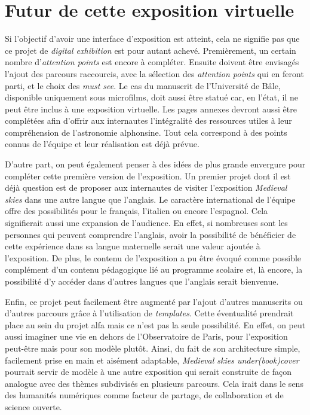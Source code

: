 	\section{Futur de cette exposition virtuelle}
	Si l'objectif d'avoir une interface d'exposition est atteint, cela ne signifie pas que ce projet de \textit{digital exhibition} est pour autant achevé. Premièrement, un certain nombre d'\textit{attention points} est encore à compléter. Ensuite doivent être envisagés l'ajout des parcours raccourcis, avec la sélection des \textit{attention points} qui en feront parti, et le choix des \textit{must see}. Le cas du manuscrit de l'Université de Bâle, disponible uniquement sous microfilms, doit aussi être statué car, en l'état, il ne peut être inclus à une exposition virtuelle. Les pages annexes devront aussi être complétées afin d'offrir aux internautes l'intégralité des ressources utiles à leur compréhension de l'astronomie alphonsine. Tout cela correspond à des points connus de l'équipe et leur réalisation est déjà prévue. 
	
	D'autre part, on peut également penser à des idées de plus grande envergure pour compléter cette première version de l'exposition. Un premier projet dont il est déjà question est de proposer aux internautes de visiter l'exposition \textit{Medieval skies} dans une autre langue que l'anglais. Le caractère international de l'équipe offre des possibilités pour le français, l'italien ou encore l'espagnol. Cela signifierait aussi une expansion de l'audience. En effet, si nombreuses sont les personnes qui peuvent comprendre l'anglais, avoir la possibilité de bénéficier de cette expérience dans sa langue maternelle serait une valeur ajoutée à l'exposition. De plus, le contenu de l'exposition a pu être évoqué comme possible complément d'un contenu pédagogique lié au programme scolaire et, là encore, la possibilité d'y accéder dans d'autres langues que l'anglais serait bienvenue. 
	
	Enfin, ce projet peut facilement être augmenté par l'ajout d'autres manuscrits ou d'autres parcours grâce à l'utilisation de \textit{templates}. Cette éventualité prendrait place au sein du projet \acrshort{alfa} mais ce n'est pas la seule possibilité. En effet, on peut aussi imaginer une vie en dehors de l'Observatoire de Paris, pour l'exposition peut-être mais pour son modèle plutôt. Ainsi, du fait de son architecture simple, facilement prise en main et aisément adaptable, \textit{Medieval skies under(book)cover} pourrait servir de modèle à une autre exposition qui serait construite de façon analogue avec des thèmes subdivisés en plusieurs parcours. Cela irait dans le sens des humanités numériques comme facteur de partage, de collaboration et de science ouverte. \\
	
